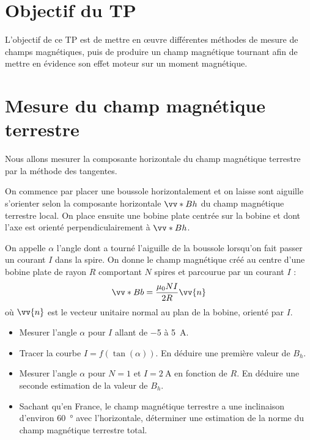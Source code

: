 \documentclass{tp}
\begin{document}


\section{Objectif du TP}
L'objectif de ce TP est de mettre en \oe{}uvre différentes méthodes de mesure de champs magnétiques, puis de produire un champ magnétique tournant afin de mettre en évidence son effet moteur sur un moment magnétique.

\section{Mesure du champ magnétique terrestre}%
\label{sec:mesure_du_champ_magnetique_terrestre}

Nous allons mesurer la composante horizontale du champ magnétique terrestre par la méthode des tangentes. 

On commence par placer une boussole horizontalement et on laisse sont aiguille s'orienter selon la composante horizontale $\vv*{B}{h}$ du champ magnétique terrestre local. On place ensuite une bobine plate centrée sur la bobine et dont l'axe est orienté perpendiculairement à $\vv*{B}{h}$.

On appelle $\alpha$ l'angle dont a tourné l'aiguille de la boussole lorsqu'on fait passer un courant $I$ dans la spire. On donne le champ magnétique créé au centre d'une bobine plate de rayon $R$ comportant $N$ spires et parcourue par un courant $I$ :
\begin{equation}
  \vv*{B}{b} = \frac{\mu_0 N I }{2R}\vv{n}
\end{equation}
où $\vv{n}$ est le vecteur unitaire normal au plan de la bobine, orienté par $I$. 

\begin{itemize}
  \item Mesurer l'angle $\alpha$ pour $I$ allant de \num{-5} à \SI{5}{\ampere}.
  \item Tracer la courbe $I = f(\tan(\alpha))$. En déduire une première valeur de $B_h$. 
  \item Mesurer l'angle $\alpha$ pour $N=1$ et $I=\SI{2}{\ampere}$ en fonction de $R$.  En déduire une seconde estimation de la valeur de $B_h$. 
  \item Sachant qu'en France, le champ magnétique terrestre a une inclinaison d'environ \SI{60}{\degree} avec l'horizontale, déterminer une estimation de la norme du champ magnétique terrestre total.
\end{itemize}
\end{document}
